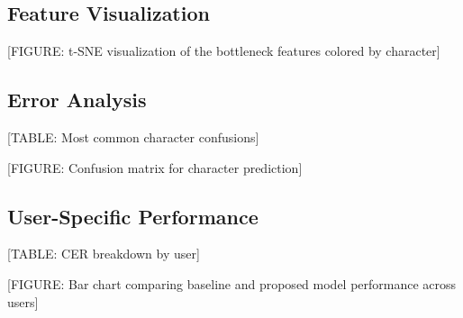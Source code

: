 \subsection{Feature Visualization}

[FIGURE: t-SNE visualization of the bottleneck features colored by character]

\subsection{Error Analysis}

[TABLE: Most common character confusions]

[FIGURE: Confusion matrix for character prediction]

\subsection{User-Specific Performance}

[TABLE: CER breakdown by user]

[FIGURE: Bar chart comparing baseline and proposed model performance across users]